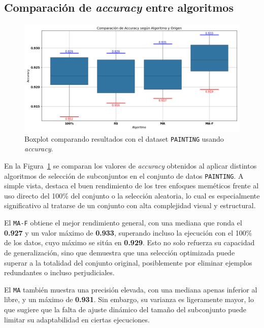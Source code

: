 \subsection{Comparación de \textit{accuracy} entre algoritmos}
\begin{figure}[htp]
    \centering
    \includegraphics[width=1\textwidth]{imagenes/evaluaciones/painting/comparacion-por-algoritmo.png}
    \caption{Boxplot comparando resultados con el dataset \texttt{PAINTING} usando \textit{accuracy}.}
    \label{fig:comparacion-por-algoritmo}
\end{figure}

En la Figura~\ref{fig:comparacion-por-algoritmo} se comparan los valores de \textit{accuracy} obtenidos al aplicar distintos
algoritmos de selección de subconjuntos en el conjunto de datos \texttt{PAINTING}.
A simple vista, destaca el buen rendimiento de los tres enfoques meméticos frente al uso directo del 100\% del conjunto o la selección aleatoria,
lo cual es especialmente significativo al tratarse de un conjunto con alta complejidad visual y estructural.

El \texttt{MA-F} obtiene el mejor rendimiento general, con una mediana que ronda el \textbf{0.927} y un valor máximo de \textbf{0.933},
superando incluso la ejecución con el 100\% de los datos, cuyo máximo se sitúa en \textbf{0.929}.
Esto no solo refuerza su capacidad de generalización, sino que demuestra que una selección optimizada puede superar a la totalidad del conjunto original,
posiblemente por eliminar ejemplos redundantes o incluso perjudiciales.

El \texttt{MA} también muestra una precisión elevada, con una mediana apenas inferior al libre, y un máximo de \textbf{0.931}.
Sin embargo, su varianza es ligeramente mayor, lo que sugiere que la falta de ajuste dinámico del tamaño del subconjunto puede limitar su adaptabilidad en ciertas ejecuciones.

